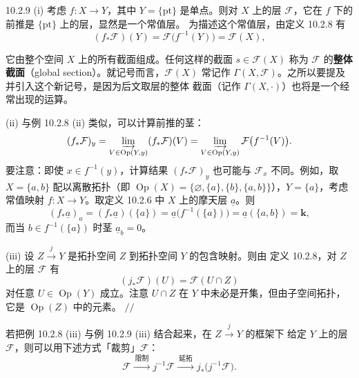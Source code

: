 \begin{wexam}{10.2.9}
  (i) 考虑 $f\colon X\to Y$，其中 $Y=\{\mathrm{pt}\}$ 是单点。则对 $X$ 上的层
  $\mathcal{F}$，它在 $f$ 下的前推是 $\{\mathrm{pt}\}$ 上的层，显然是一个常值层。
  为描述这个常值层，由定义 10.2.8 有
  \[
    (f_\ast\mathcal{F})(Y)=\mathcal{F}\bigl(f^{-1}(Y)\bigr)=\mathcal{F}(X),
  \]

  它由整个空间 $X$ 上的所有截面组成。任何这样的截面 $s\in\mathcal{F}(X)$ 称为
$\mathcal{F}$ 的\textbf{整体截面}（global section）。就记号而言，$\mathcal{F}(X)$
常记作 $\Gamma(X,\mathcal{F})$。之所以要提及并引入这个新记号，是因为后文取层的整体
截面（记作 $\Gamma(X,\cdot)$）也将是一个经常出现的运算。

(ii) 与例 10.2.8 (ii) 类似，可以计算前推的茎：
\[
  (f_\ast\mathcal{F})_y
  =\varinjlim_{V\in\operatorname{Op}(Y,y)}(f_\ast\mathcal{F})(V)
  =\varinjlim_{V\in\operatorname{Op}(Y,y)}\mathcal{F}\bigl(f^{-1}(V)\bigr).
\]
要注意：即使 $x\in f^{-1}(y)$，计算结果 $(f_\ast\mathcal{F})_y$ 也可能与
$\mathcal{F}_x$ 不同。例如，取 $X=\{a,b\}$ 配以离散拓扑（即
$\operatorname{Op}(X)=\{\varnothing,\{a\},\{b\},\{a,b\}\}$），$Y=\{a\}$，考虑常值映射
$f\colon X\to Y$。取定义 10.2.6 中 $X$ 上的摩天层 $\underline{a}$。则
\[
  (f_\ast\underline{a})_a
  =(f_\ast\underline{a})(\{a\})
  =\underline{a}\bigl(f^{-1}(\{a\})\bigr)
  =\underline{a}(\{a,b\})=\mathbf{k},
\]
而当 $b\in f^{-1}(\{a\})$ 时茎 $\underline{a}_b=0$。

(iii) 设 $Z\xrightarrow{j}Y$ 是拓扑空间 $Z$ 到拓扑空间 $Y$ 的包含映射。则由
定义 10.2.8，对 $Z$ 上的层 $\mathcal{F}$ 有
\[
  (j_\ast\mathcal{F})(U)=\mathcal{F}(U\cap Z)
\]
  对任意 $U\in\operatorname{Op}(Y)$ 成立。注意 $U\cap Z$ 在 $Y$ 中未必是开集，但由子空间拓扑，
  它是 $\operatorname{Op}(Z)$ 中的元素。
  \hfill$//$
\end{wexam}

若把例 10.2.8 (iii) 与例 10.2.9 (iii) 结合起来，在 $Z\xrightarrow{j}Y$ 的框架下
给定 $Y$ 上的层 $\mathcal{F}$，则可以用下述方式「裁剪」$\mathcal{F}$：
\begin{equation}\tag{10.7}
  \mathcal{F}
  \xrightarrow{\ \text{限制}\ }
  j^{-1}\mathcal{F}
  \xrightarrow{\ \text{延拓}\ }
  j_\ast\bigl(j^{-1}\mathcal{F}\bigr).
\end{equation}

